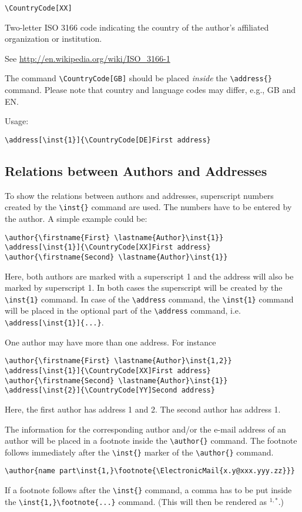 \documentclass{article}
\begin{document}
\verb+\CountryCode[XX]+

Two-letter ISO 3166 code indicating the country of the author's affiliated
organization or institution.

See \url{http://en.wikipedia.org/wiki/ISO_3166-1}

The command \verb+\CountryCode[GB]+ should be placed \emph{inside} the
\verb+\address{}+ command. Please note that country and language codes may
differ, e.g., GB and EN.

Usage:

\verb+\address[\inst{1}]{\CountryCode[DE]First address}+
\subsection{Relations between Authors and Addresses}

To show the relations between authors and addresses, superscript numbers
created by the \verb+\inst{}+ command are used. The numbers have to be 
entered by the author. A simple example could be:
\begin{verbatim}
\author{\firstname{First} \lastname{Author}\inst{1}}
\address[\inst{1}]{\CountryCode[XX]First address}
\author{\firstname{Second} \lastname{Author}\inst{1}}
\end{verbatim}
Here, both authors are marked with a superscript 1 and the address  will also
be marked by superscript 1. In both cases the superscript will be created by
the \verb+\inst{1}+ command. In case of the \verb+\address+ command, the
\verb+\inst{1}+ command will be placed in the optional part of the
\verb+\address+ command, i.e. \verb+\address[\inst{1}]{...}+. 

One author may have more than one address. For instance
\begin{verbatim}
\author{\firstname{First} \lastname{Author}\inst{1,2}}
\address[\inst{1}]{\CountryCode[XX]First address}
\author{\firstname{Second} \lastname{Author}\inst{1}}
\address[\inst{2}]{\CountryCode[YY]Second address}
\end{verbatim}
Here, the first author has address 1 and 2. The second author has address 1.

The information for the corresponding author and/or the e-mail address of an
author will be placed in a footnote inside the \verb+\author{}+ command. The
footnote follows immediately after the \verb+\inst{}+ marker of the
\verb+\author{}+ command.
\begin{verbatim}
\author{name part\inst{1,}\footnote{\ElectronicMail{x.y@xxx.yyy.zz}}}
\end{verbatim}
If a footnote follows after the \verb+\inst{}+ command, a comma has to be put
inside the \verb+\inst{1,}\footnote{...}+ command. (This will then be rendered
as $^{1,*}$.)
\end{document}
